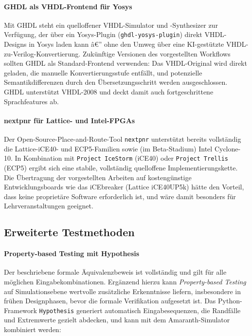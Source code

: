 ﻿\documentclass[12pt,a4paper]{report}
\begin{document}
\paragraph{GHDL als VHDL-Frontend für Yosys}
Mit GHDL \cite{ghdl2024} steht ein quelloffener VHDL-Simulator und -Synthesizer zur
Verfügung, der über ein Yosys-Plugin (\texttt{ghdl-yosys-plugin}) direkt VHDL-Designs
in Yosys laden kann â€” ohne den Umweg über eine KI-gestützte VHDL-zu-Verilog-Konvertierung.
Zukünftige Versionen des vorgestellten Workflows sollten GHDL als Standard-Frontend
verwenden: Das VHDL-Original wird direkt geladen, die manuelle Konvertierungsstufe
entfällt, und potenzielle Semantikdifferenzen durch den Übersetzungsschritt werden
ausgeschlossen. GHDL unterstützt VHDL-2008 und deckt damit auch fortgeschrittene
Sprachfeatures ab.

\paragraph{nextpnr für Lattice- und Intel-FPGAs}
Der Open-Source-Place-and-Route-Tool \texttt{nextpnr} unterstützt bereits vollständig die
Lattice-iCE40- und ECP5-Familien sowie (im Beta-Stadium) Intel Cyclone-10. In Kombination
mit \texttt{Project IceStorm} (iCE40) oder \texttt{Project Trellis} (ECP5) ergibt sich
eine stabile, vollständig quelloffene Implementierungskette. Die Übertragung der
vorgestellten Arbeiten auf kostengünstige Entwicklungsboards wie das iCEbreaker
(Lattice iCE40UP5k) hätte den Vorteil, dass keine proprietäre Software
erforderlich ist, und wäre damit besonders für Lehrveranstaltungen geeignet.

\subsection{Erweiterte Testmethoden}

\paragraph{Property-based Testing mit Hypothesis}
Der beschriebene formale Äquivalenzbeweis ist vollständig und gilt für alle möglichen
Eingabekombinationen. Ergänzend hierzu kann \textit{Property-based Testing} auf
Simulationsebene wertvolle zusätzliche Erkenntnisse liefern, insbesondere in frühen
Designphasen, bevor die formale Verifikation aufgesetzt ist. Das Python-Framework
\texttt{Hypothesis} \cite{hypothesis2024} generiert automatisch Eingabesequenzen, die
Randfälle und Extremwerte gezielt abdecken, und kann mit dem Amaranth-Simulator
kombiniert werden:
\end{document}
